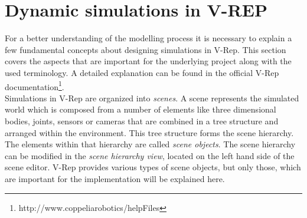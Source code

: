 
\section{Dynamic simulations in V-REP}
For a better understanding of the modelling process it is necessary to explain a few fundamental concepts about designing simulations in V-Rep. This section covers the aspects that are important for the underlying project along with the used terminology. A detailed explanation can be found in the official V-Rep documentation\footnote{http://www.coppeliarobotics/helpFiles}. \\

Simulations in V-Rep are organized into \emph{scenes}. A scene represents the simulated world which is composed from a number of elements like three dimensional bodies, joints, sensors or cameras that are combined in a tree structure and arranged within the environment. This tree structure forms the scene hierarchy. The elements within that hierarchy are called \emph{scene objects}. The scene hierarchy can be modified in the \emph{scene hierarchy view}, located on the left hand side of the scene editor. V-Rep provides various types of scene objects, but only those, which are important for the implementation will be explained here.

